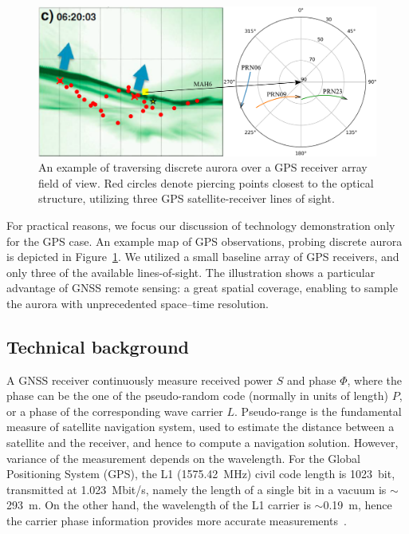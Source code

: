 \documentclass[letterpaper,12pt]{article}
\begin{document}
\begin{figure}
\centering
\includegraphics[width=.6\textwidth]{fig/mahali-map-orbits.png}
\caption{An example of traversing discrete aurora over a GPS receiver array field of view. Red circles denote piercing points closest to the optical structure, utilizing three GPS satellite-receiver lines of sight.}
\label{fig:mahli-aurora}
\end{figure}

For practical reasons, we focus our discussion of technology demonstration only for the GPS case. An example map of GPS observations, probing discrete aurora is depicted in Figure~\ref{fig:mahli-aurora}. We utilized a small baseline array of GPS receivers, and only three of the available lines-of-sight. The illustration shows a particular advantage of GNSS remote sensing: a great spatial coverage, enabling to sample the aurora with unprecedented space--time resolution.


\vspace{-1em}\subsection{Technical background}
A GNSS receiver continuously measure received power $S$ and phase $\Phi$, where the phase can be the one of the pseudo-random code (normally in units of length) $P$, or a phase of the corresponding wave carrier $L$. Pseudo-range is the fundamental measure of satellite navigation system, used to estimate the distance between a satellite and the receiver, and hence to compute a navigation solution. However, variance of the measurement depends on the wavelength. For the Global Positioning System (GPS), the L1 (1575.42~MHz) civil code length is 1023~bit, transmitted at 1.023~Mbit/s, namely the length of a single bit in a vacuum is $\sim$293~m. On the other hand, the wavelength of the L1 carrier is $\sim$0.19~m, hence the carrier phase information provides more accurate measurements~\citep{Coster1992, Coster2012}.
\end{document}
